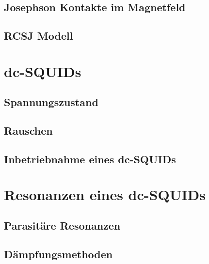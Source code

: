\subsection{Josephson Kontakte im Magnetfeld}

\Blindtext

\subsection{RCSJ Modell}

\section{dc-SQUIDs}

\blindtext[3]

\subsection{Spannungszustand}

\subsection{Rauschen}

\subsection{Inbetriebnahme eines dc-SQUIDs}


\section{Resonanzen eines dc-SQUIDs}

\subsection{Parasitäre Resonanzen}

\subsection{Dämpfungsmethoden}


